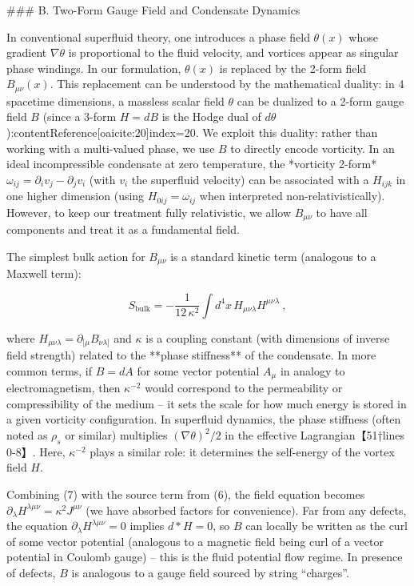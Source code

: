 \documentclass[12pt]{article}
\begin{document}
### B. Two-Form Gauge Field and Condensate Dynamics

In conventional superfluid theory, one introduces a phase field $\theta(x)$ whose gradient $\nabla\theta$ is proportional to the fluid velocity, and vortices appear as singular phase windings. In our formulation, $\theta(x)$ is replaced by the 2-form field $B_{\mu\nu}(x)$. This replacement can be understood by the mathematical duality: in 4 spacetime dimensions, a massless scalar field $\theta$ can be dualized to a 2-form gauge field $B$ (since a 3-form $H=dB$ is the Hodge dual of $d\theta$):contentReference[oaicite:20]{index=20}. We exploit this duality: rather than working with a multi-valued phase, we use $B$ to directly encode vorticity. In an ideal incompressible condensate at zero temperature, the *vorticity 2-form* $\omega_{ij} = \partial_i v_j - \partial_j v_i$ (with $v_i$ the superfluid velocity) can be associated with a $H_{ijk}$ in one higher dimension (using $H_{0ij} = \omega_{ij}$ when interpreted non-relativistically). However, to keep our treatment fully relativistic, we allow $B_{\mu\nu}$ to have all components and treat it as a fundamental field.

The simplest bulk action for $B_{\mu\nu}$ is a standard kinetic term (analogous to a Maxwell term):

\[ S_{\text{bulk}} = -\frac{1}{12\,\kappa^2} \int d^4x\, H_{\mu\nu\lambda} H^{\mu\nu\lambda}~, \tag{7} \] 

where $H_{\mu\nu\lambda}=\partial_{[\mu}B_{\nu\lambda]}$ and $\kappa$ is a coupling constant (with dimensions of inverse field strength) related to the **phase stiffness** of the condensate. In more common terms, if $B=dA$ for some vector potential $A_\mu$ in analogy to electromagnetism, then $\kappa^{-2}$ would correspond to the permeability or compressibility of the medium – it sets the scale for how much energy is stored in a given vorticity configuration. In superfluid dynamics, the phase stiffness (often noted as $\rho_s$ or similar) multiplies $(\nabla\theta)^2/2$ in the effective Lagrangian【51†lines 0-8】. Here, $\kappa^{-2}$ plays a similar role: it determines the self-energy of the vortex field $H$. 

Combining (7) with the source term from (6), the field equation becomes $\partial_\lambda H^{\lambda\mu\nu} = \kappa^2 J^{\mu\nu}$ (we have absorbed factors for convenience). Far from any defects, the equation $\partial_\lambda H^{\lambda\mu\nu}=0$ implies $d*H=0$, so $B$ can locally be written as the curl of some vector potential (analogous to a magnetic field being curl of a vector potential in Coulomb gauge) – this is the fluid potential flow regime. In presence of defects, $B$ is analogous to a gauge field sourced by string “charges”. 
\end{document}
